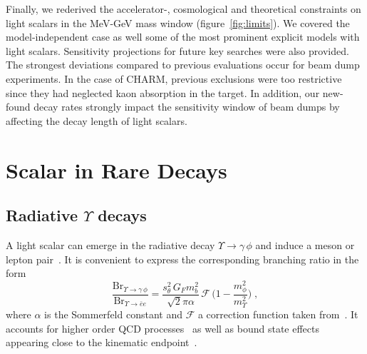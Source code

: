 \documentclass[preprintnumbers,twocolumn,aps,floats,nofootinbib]{revtex4-1}
\begin{document}
Finally, we rederived the accelerator-, cosmological and theoretical constraints on light scalars in the MeV-GeV mass window (figure~\ref{fig:limits}). We covered the model-independent case as well some of the most prominent explicit models with light scalars. Sensitivity projections for future key searches were also provided. The strongest deviations compared to previous evaluations occur for beam dump experiments. In the case of CHARM, previous exclusions were too restrictive since they had neglected kaon absorption in the target. In addition, our new-found decay rates strongly impact the sensitivity window of beam dumps by affecting the decay length of light scalars.

\appendix


\section{Scalar in Rare Decays}\label{sec:rare}

\subsection{Radiative $\Upsilon$ decays}
A light scalar can emerge in the radiative decay $\Upsilon \rightarrow \gamma \, \phi$ and induce a meson or lepton pair~\cite{Wilczek:1977zn}. It is convenient to express the corresponding branching ratio in the form
\begin{equation}\label{eq:upsilon}
 \frac{\text{Br}_{\Upsilon\rightarrow \gamma\,\phi}}{\text{Br}_{\Upsilon\rightarrow \bar{e} e }}=\frac{s_\theta^2\, G_F m_b^2}{\sqrt{2}\pi\alpha}\,\mathcal{F}\,\Big(
1-\frac{m_\phi^2}{m^2_\Upsilon}\Big)\;,
\end{equation}
where $\alpha$ is the Sommerfeld constant and $\mathcal{F}$ a correction function taken from~\cite{Ellis:1985yb}. It accounts for higher order QCD processes~\cite{Vysotsky:1980cz,Nason:1986tr} as well as bound state effects appearing close to the kinematic endpoint~\cite{Haber:1978jt,Ellis:1979jy}.
\end{document}

